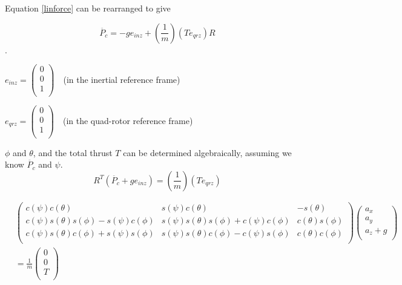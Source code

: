 Equation \ref{linforce} can be rearranged to give


\begin{equation}
    \label{eq:acc_from_model}
    \ddot{P_c} = - g e_{inz} + (\frac{1}{m}) (T e_{qrz}) R
\end{equation}.


$ e_{inz} = \left( \begin{array}{c}
0\\0\\1\\
\end{array}\right) \text{  }$ (in the inertial reference frame)

$ e_{qrz} = \left( \begin{array}{c}
0\\0\\1\\
\end{array}\right) \text{  }$  (in the quad-rotor reference frame)

$\phi$ and $\theta$, and the total thrust $T$ can be determined algebraically, assuming we know $\ddot{P_c}$ and $\psi$.\\

\begin{equation}
    \label{eq:thrustTransformation}
    R^T ( \ddot{P_c} + g e_{inz}) = (\frac{1}{m}) (T e_{qrz})
\end{equation}


\begin{equation}
\begin{split}
    &\left( \begin{array}{ccc}
        c(\psi) c(\theta) & s(\psi) c(\theta) & -s(\theta)\\
        c(\psi) s(\theta) s(\phi) - s(\psi) c(\phi) & s(\psi) s(\theta) s(\phi) + c(\psi) c(\phi) & c(\theta) s(\phi)\\
        c(\psi) s(\theta) c(\phi) + s(\psi) s(\phi) & s(\psi) s(\theta) c(\phi) - c(\psi) s(\phi) & c(\theta) c(\phi)\\
    \end{array} \right)\left( \begin{array}{c} a_x\\a_y\\a_z+g\\\end{array} \right)\\
    &= \frac{1}{m} \left( \begin{array}{c} 0\\0\\T\\ \end{array} \right)
\end{split}
\end{equation}

